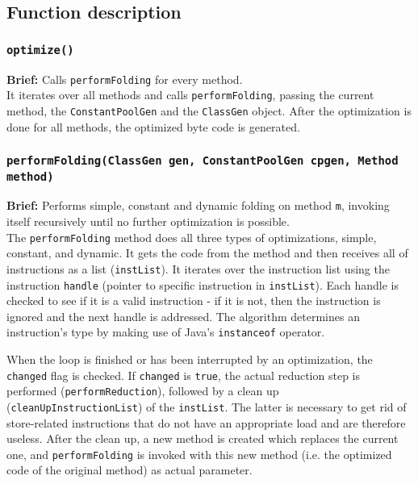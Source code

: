 \subsection{Function description}

\subsubsection{\texttt{optimize()}}

\textbf{Brief: }Calls \texttt{performFolding} for every method.\\

It iterates over all methods and calls \texttt{performFolding}, passing the current method, the \texttt{ConstantPoolGen} and the \texttt{ClassGen} object. After the optimization is done for all methods, the optimized byte code is generated.

\subsubsection{\texttt{performFolding(ClassGen gen, ConstantPoolGen cpgen, Method method)}}

\textbf{Brief: }Performs simple, constant and dynamic folding on method \texttt{m}, invoking itself recursively until no further optimization is possible. \\


The \texttt{performFolding} method does all three types of optimizations, simple, constant, and dynamic. It gets the code from the method and then receives all of instructions as a list (\texttt{instList}). It iterates over the instruction list using the instruction \texttt{handle} (pointer to specific instruction in \texttt{instList}). Each handle is checked to see if it is a valid instruction - if it is not, then the instruction is ignored and the next handle is addressed. The algorithm determines an instruction’s type by making use of Java's \texttt{instanceof} operator.

When the loop is finished or has been interrupted by an optimization, the \texttt{changed} flag is checked. If \texttt{changed} is \texttt{true}, the actual reduction step is performed (\texttt{performReduction}), followed by a clean up (\texttt{cleanUpInstructionList}) of the \texttt{instList}. The latter is necessary to get rid of store-related instructions that do not have an appropriate load and are therefore useless. After the clean up, a new method is created which replaces the current one, and \texttt{performFolding} is invoked with this new method (i.e. the optimized code of the original method) as actual parameter. 


